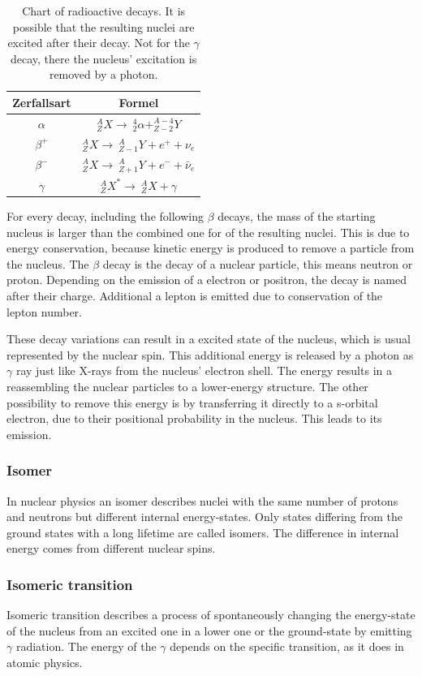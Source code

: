 \documentclass[]{article}
\begin{document}
\renewcommand{\arraystretch}{1.5}
\begin{table}[H]
\centering
\begin{tabular}{c||c}
Zerfallsart & Formel   \\ \hline
$\alpha$ & $_Z^A X \rightarrow\ _2^4\alpha + _{Z-2}^{A-4} Y$ \\ \hline
$\beta^+$ &   $_Z^A X \rightarrow\  _{Z-1}^{A}Y + e^+ + \nu_e$ \\ \hline
$\beta^-$ &   $_Z^A X \rightarrow\  _{Z+1}^{A}Y + e^- +  \bar{\nu}_e$ \\ \hline
$\gamma$ &  $_Z^A X^* \rightarrow\ _Z^A X + \gamma$  \end{tabular}
\caption{Chart of radioactive decays. It is possible that the resulting nuclei are excited after their decay. Not for the $\gamma$ decay, there the nucleus' excitation is removed by a photon. }
\label{tab:zerfall}
\end{table}
\renewcommand{\arraystretch}{1}

For every decay, including the following $\beta$ decays, the mass of the starting nucleus is larger than the combined one for of the resulting nuclei. This is due to energy conservation, because kinetic energy is produced to remove a particle from the nucleus.
The $\beta$ decay is the decay of a nuclear particle, this means neutron or proton. Depending on the emission of a electron or positron, the decay is named after their charge. Additional a lepton is emitted due to conservation of the lepton number. 

These decay variations can result in a excited state of the nucleus, which is usual represented by the nuclear spin. This additional energy is released by a photon as $\gamma$ ray just like X-rays from the nucleus' electron shell. The energy results in a reassembling the nuclear particles to a lower-energy structure. The other possibility to remove this energy is by transferring it directly to a s-orbital electron, due to their positional probability in the nucleus. This leads to its emission.

\subsubsection{Isomer}
In nuclear physics an isomer describes nuclei with the same number of protons and neutrons but different internal energy-states. Only states differing from the ground states with a long lifetime are called isomers. The difference in internal energy comes from different nuclear spins.
\subsubsection{Isomeric transition}
Isomeric transition describes a process of spontaneously changing the energy-state of the nucleus from an excited one in a lower one or the ground-state by emitting $\gamma$ radiation. The energy of the $\gamma$ depends on the specific transition, as it does in atomic physics.
\end{document}
